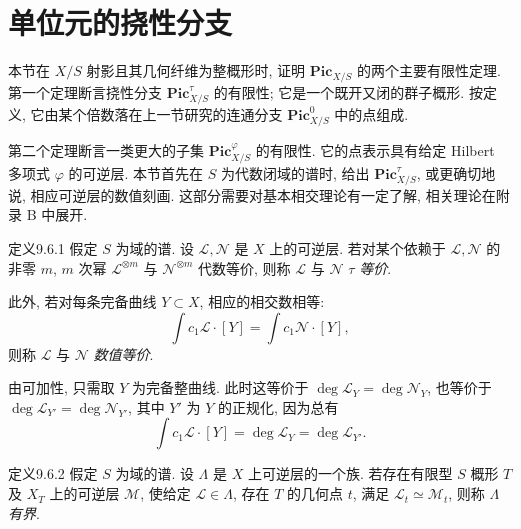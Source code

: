 \section{单位元的挠性分支}\label{ch09s6:section}
本节在 $X/S$ 射影且其几何纤维为整概形时, 证明 $\mathbf{Pic}_{X/S}$ 的两个主要有限性定理. 第一个定理断言挠性分支 $\mathbf{Pic}_{X/S}^{\tau}$ 的有限性; 它是一个既开又闭的群子概形. 按定义, 它由某个倍数落在上一节研究的连通分支 $\mathbf{Pic}_{X/S}^0$ 中的点组成.

第二个定理断言一类更大的子集 $\mathbf{Pic}_{X/S}^{\varphi}$ 的有限性. 它的点表示具有给定 Hilbert 多项式 $\varphi$ 的可逆层. 本节首先在 $S$ 为代数闭域的谱时, 给出 $\mathbf{Pic}_{X/S}^{\tau}$, 或更确切地说, 相应可逆层的数值刻画. 这部分需要对基本相交理论有一定了解, 相关理论在附录 B 中展开.

\begin{origstatement}{定义}{9.6.1}\label{ch09s6:def961}
假定 $S$ 为域的谱. 设 $\mathcal L,\mathcal N$ 是 $X$ 上的可逆层. 若对某个依赖于 $\mathcal L,\mathcal N$ 的非零 $m$, $m$ 次幂 $\mathcal L^{\otimes m}$ 与 $\mathcal N^{\otimes m}$ 代数等价, 则称 $\mathcal L$ 与 $\mathcal N$ \emph{$\tau$ 等价}.

此外, 若对每条完备曲线 $Y\subset X$, 相应的相交数相等:
\[\int c_1\mathcal L\cdot[Y]=\int c_1\mathcal N\cdot[Y],\]
则称 $\mathcal L$ 与 $\mathcal N$ \emph{数值等价}.
\end{origstatement}
由可加性, 只需取 $Y$ 为完备整曲线. 此时这等价于 $\deg\mathcal L_Y=\deg\mathcal N_Y$, 也等价于 $\deg\mathcal L_{Y'}=\deg\mathcal N_{Y'}$, 其中 $Y'$ 为 $Y$ 的正规化, 因为总有
\[\int c_1\mathcal L\cdot[Y]=\deg\mathcal L_Y=\deg\mathcal L_{Y'}.\]

\begin{origstatement}{定义}{9.6.2}\label{ch09s6:def962}
假定 $S$ 为域的谱. 设 $\Lambda$ 是 $X$ 上可逆层的一个族. 若存在有限型 $S$ 概形 $T$ 及 $X_T$ 上的可逆层 $\mathcal M$, 使给定 $\mathcal L\in\Lambda$, 存在 $T$ 的几何点 $t$, 满足 $\mathcal L_t\simeq\mathcal M_t$, 则称 $\Lambda$ \emph{有界}.
\end{origstatement}

